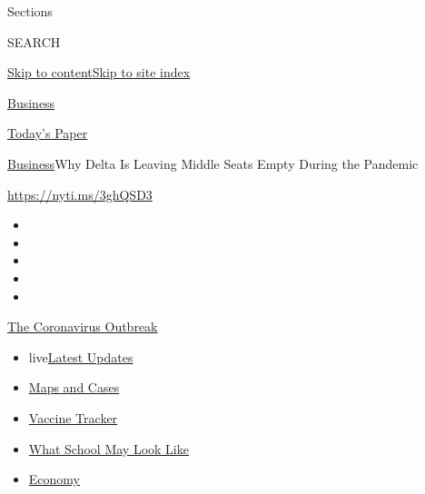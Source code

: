 Sections

SEARCH

\protect\hyperlink{site-content}{Skip to
content}\protect\hyperlink{site-index}{Skip to site index}

\href{https://www.nytimes.com/section/business}{Business}

\href{https://myaccount.nytimes.com/auth/login?response_type=cookie\&client_id=vi}{}

\href{https://www.nytimes.com/section/todayspaper}{Today's Paper}

\href{/section/business}{Business}\textbar{}Why Delta Is Leaving Middle
Seats Empty During the Pandemic

\url{https://nyti.ms/3ghQSD3}

\begin{itemize}
\item
\item
\item
\item
\item
\end{itemize}

\href{https://www.nytimes.com/news-event/coronavirus?action=click\&pgtype=Article\&state=default\&region=TOP_BANNER\&context=storylines_menu}{The
Coronavirus Outbreak}

\begin{itemize}
\tightlist
\item
  live\href{https://www.nytimes.com/2020/08/01/world/coronavirus-covid-19.html?action=click\&pgtype=Article\&state=default\&region=TOP_BANNER\&context=storylines_menu}{Latest
  Updates}
\item
  \href{https://www.nytimes.com/interactive/2020/us/coronavirus-us-cases.html?action=click\&pgtype=Article\&state=default\&region=TOP_BANNER\&context=storylines_menu}{Maps
  and Cases}
\item
  \href{https://www.nytimes.com/interactive/2020/science/coronavirus-vaccine-tracker.html?action=click\&pgtype=Article\&state=default\&region=TOP_BANNER\&context=storylines_menu}{Vaccine
  Tracker}
\item
  \href{https://www.nytimes.com/interactive/2020/07/29/us/schools-reopening-coronavirus.html?action=click\&pgtype=Article\&state=default\&region=TOP_BANNER\&context=storylines_menu}{What
  School May Look Like}
\item
  \href{https://www.nytimes.com/live/2020/07/31/business/stock-market-today-coronavirus?action=click\&pgtype=Article\&state=default\&region=TOP_BANNER\&context=storylines_menu}{Economy}
\end{itemize}

